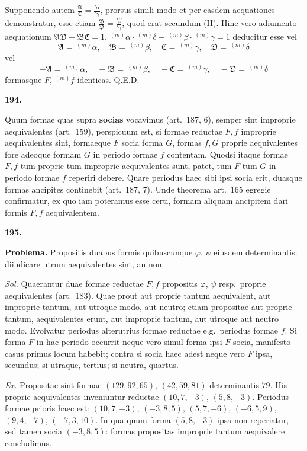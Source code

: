 \documentclass[12pt,a4paper]{article}
\theoremstyle{plain}
\theoremstyle{definition}
\theoremstyle{remark}
\newcommand{\qeode}{\textsc{Q.E.D.}}
\begin{document}
Supponendo autem $\frac{\mathfrak{A}}{\mathfrak{C}}=\frac{'\alpha}{'\gamma}$, prorsus simili modo et per easdem aequationes demonstratur, esse etiam $\frac{\mathfrak{B}}{\mathfrak{D}}=\frac{'\beta}{'\gamma}$, quod erat secundum (II). Hinc vero adiumento aequationum $\mathfrak{A}\mathfrak{D}-\mathfrak{B}\mathfrak{C}=1$, $^{(m)}\alpha\cdot\,^{(m)}\delta-\,^{(m)}\beta\cdot\,^{(m)}\gamma=1$ deducitur esse vel
\[\mathfrak{A}=\,^{(m)}\alpha,\quad \mathfrak{B}=\,^{(m)}\beta,\quad \mathfrak{C}=\,^{(m)}\gamma,\quad \mathfrak{D}=\,^{(m)}\delta\]
vel
\[-\mathfrak{A}=\,^{(m)}\alpha,\quad -\mathfrak{B}=\,^{(m)}\beta,\quad -\mathfrak{C}=\,^{(m)}\gamma,\quad -\mathfrak{D}=\,^{(m)}\delta\]
formasque $F$, $^{(m)}f$ identicas. \qeode

\textbf{194.}

Quum formae quas supra \textbf{socias} vocavimus (art.\ 187, 6), semper sint improprie aequivalentes (art.\ 159), perspicuum est, si formae reductae $F,f$ improprie aequivalentes sint, formaeque $F$ socia forma $G$, formas $f,G$ proprie aequivalentes fore adeoque formam $G$ in periodo formae $f$ contentam. Quodsi itaque formae $F,f$ tum proprie tum improprie aequivalentes sunt, patet, tum $F$ tum $G$ in periodo formae $f$ reperiri debere. Quare periodus haec sibi ipsi socia erit, duasque formas ancipites continebit (art.\ 187, 7). Unde theorema art.\ 165 egregie confirmatur, ex quo iam poteramus esse certi, formam aliquam ancipitem dari formis $F,f$ aequivalentem.

\textbf{195.}

\textbf{Problema.} Propositis duabus formis quibuscunque $\varphi$, $\psi$ eiusdem determinantis: diiudicare utrum aequivalentes sint, an non.

\textit{Sol.} Quaerantur duae formae reductae $F,f$ propositis $\varphi$, $\psi$ resp.\ proprie aequivalentes (art.\ 183). Quae prout aut proprie tantum aequivalent, aut improprie tantum, aut utroque modo, aut neutro; etiam propositae aut proprie tantum, aequivalentes erunt, aut improprie tantum, aut utroque aut neutro modo. Evolvatur periodus alterutrius formae reductae e.g.\ periodus formae $f$. Si forma $F$ in hac periodo occurrit neque vero simul forma ipsi $F$ socia, manifesto casus primus locum habebit; contra si socia haec adest neque vero $F$ ipsa, secundus; si utraque, tertius; si neutra, quartus.

\textit{Ex.} Propositae sint formae $(129,92,65)$, $(42,59,81)$ determinantis $79$. His proprie aequivalentes inveniuntur reductae $(10,7,-3)$, $(5,8,-3)$. Periodus formae prioris haec est: $(10,7,-3)$, $(-3,8,5)$, $(5,7,-6)$, $(-6,5,9)$, $(9,4,-7)$, $(-7,3,10)$. In qua quum forma $(5,8,-3)$ ipsa non reperiatur, sed tamen socia $(-3,8,5)$: formas propositas improprie tantum aequivalere concludimus.
\end{document}
